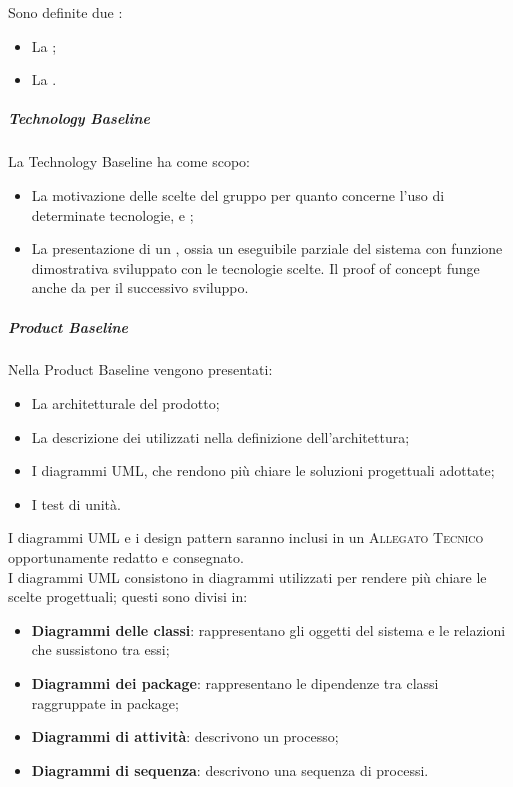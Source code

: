 \documentclass[../norme-di-progetto.tex]{subfiles}
\begin{document}
Sono definite due :
\begin{itemize}
  \item La \textbf{};
  \item La \textbf{}.
\end{itemize}

\subparagraph*{Technology Baseline}
La Technology Baseline ha come scopo:
\begin{itemize}
  \item La motivazione delle scelte del gruppo per quanto concerne l'uso di determinate tecnologie,  e ;
  \item La presentazione di un , ossia un eseguibile parziale del sistema con funzione dimostrativa sviluppato con le tecnologie scelte. Il proof of concept funge anche da  per il successivo sviluppo.
\end{itemize}

\subparagraph*{Product Baseline}
Nella Product Baseline vengono presentati:
\begin{itemize}
  \item La  architetturale del prodotto;
  \item La descrizione dei  utilizzati nella definizione dell'architettura;
  \item I diagrammi UML, che rendono più chiare le soluzioni progettuali adottate;
  \item I test di unità.
\end{itemize}
I diagrammi UML e i design pattern saranno inclusi in un \textsc{Allegato Tecnico} opportunamente redatto e consegnato.\\
I diagrammi UML consistono in diagrammi utilizzati per rendere più chiare le scelte progettuali; questi sono divisi in:
\begin{itemize}
  \item \textbf{Diagrammi delle classi}: rappresentano gli oggetti del sistema e le relazioni che sussistono tra essi;
  \item \textbf{Diagrammi dei package}: rappresentano le dipendenze tra classi raggruppate in package;
  \item \textbf{Diagrammi di attività}: descrivono un processo;
  \item \textbf{Diagrammi di sequenza}: descrivono una sequenza di processi.
\end{itemize}
\end{document}
